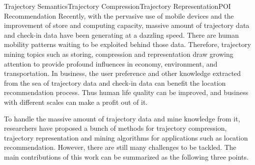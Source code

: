
\begin{Eabstract}{Trajectory Semantics}{Trajectory Compression}{Trajectory Representation}{POI Recommendation}{}
Recently, with the pervasive use of mobile devices and the improvement of store and computing capacity, massive amount of trajectory data and check-in data have been generating at a dazzling speed. There are human mobility patterns waiting to be exploited behind those data. Therefore, trajectory mining topics such as storing, compression and representation draw growing attention to provide profound influences in economy, environment, and transportation. In business, the user preference and other knowledge extracted from the sea of trajectory data and check-in data can benefit the location recommendation process. Thus human life quality can be improved, and business with different scales can make a profit out of it.




To handle the massive amount of trajectory data and mine knowledge from it, researchers have proposed a bunch of methods for trajectory compression, trajectory representation and mining algorithms for applications such as location recommendation. However, there are still many challenges to be tackled. The main contributions of this work can be summarized as the following three points.




\end{Eabstract}
